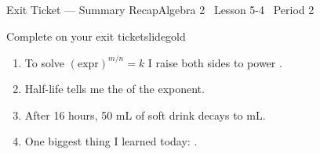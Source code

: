 \documentclass[aspectratio=169, 11pt]{beamer}
\begin{document}
\begin{frame}{Exit Ticket --- Summary Recap}{Algebra 2 \textperiodcentered\ Lesson 5-4 \textperiodcentered\ Period 2}
\vspace{0.2cm}
\begin{projcard}{Complete on your exit ticket}{slidegold}
\begin{enumerate}
  \setlength{\itemsep}{0.2cm}
  \item To solve \((\text{expr})^{m/n} = k\) I raise both sides to power \underline{\hspace{3cm}}.
  \item Half-life tells me the \underline{\hspace{3cm}} of the exponent.
  \item After 16 hours, 50 mL of soft drink decays to \underline{\hspace{2cm}} mL.
  \item One biggest thing I learned today: \underline{\hspace{5cm}}.
\end{enumerate}
\end{projcard}
\end{frame}
\end{document}
